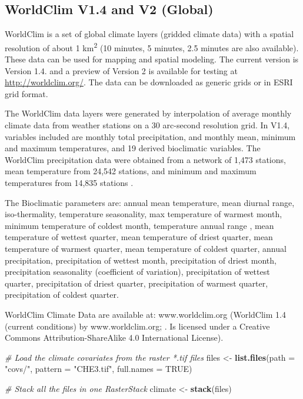 \documentclass[10pt,b5paper,]{book}
\newenvironment{Shaded}{\begin{snugshade}}{\end{snugshade}}
\newcommand{\CommentTok}[1]{\textcolor[rgb]{0.56,0.35,0.01}{\textit{#1}}}
\newcommand{\DataTypeTok}[1]{\textcolor[rgb]{0.13,0.29,0.53}{#1}}
\newcommand{\KeywordTok}[1]{\textcolor[rgb]{0.13,0.29,0.53}{\textbf{#1}}}
\newcommand{\NormalTok}[1]{#1}
\newcommand{\OtherTok}[1]{\textcolor[rgb]{0.56,0.35,0.01}{#1}}
\newcommand{\StringTok}[1]{\textcolor[rgb]{0.31,0.60,0.02}{#1}}
\theoremstyle{definition}
\theoremstyle{definition}
\theoremstyle{definition}
\theoremstyle{remark}
\begin{document}
\hypertarget{worldclim-v1.4-and-v2-global}{%
\subsection{WorldClim V1.4 and V2
(Global)}\label{worldclim-v1.4-and-v2-global}}

WorldClim is a set of global climate layers (gridded climate data) with
a spatial resolution of about 1 km\textsuperscript{2} (10 minutes, 5
minutes, 2.5 minutes are also available). These data can be used for
mapping and spatial modeling. The current version is Version 1.4. and a
preview of Version 2 is available for testing at
\url{http://worldclim.org/}. The data can be downloaded as generic grids
or in ESRI grid format.

The WorldClim data layers were generated by interpolation of average
monthly climate data from weather stations on a 30 arc-second resolution
grid. In V1.4, variables included are monthly total precipitation, and
monthly mean, minimum and maximum temperatures, and 19 derived
bioclimatic variables. The WorldClim precipitation data were obtained
from a network of 1,473 stations, mean temperature from 24,542 stations,
and minimum and maximum temperatures from 14,835 stations
\citep{hijmans2005very}.

The Bioclimatic parameters are: annual mean temperature, mean diurnal
range, iso-thermality, temperature seasonality, max temperature of
warmest month, minimum temperature of coldest month, temperature annual
range , mean temperature of wettest quarter, mean temperature of driest
quarter, mean temperature of warmest quarter, mean temperature of
coldest quarter, annual precipitation, precipitation of wettest month,
precipitation of driest month, precipitation seasonality (coefficient of
variation), precipitation of wettest quarter, precipitation of driest
quarter, precipitation of warmest quarter, precipitation of coldest
quarter.

WorldClim Climate Data are available at: www.worldclim.org (WorldClim
1.4 (current conditions) by www.worldclim.org; \citet{hijmans2005very}.
Is licensed under a Creative Commons Attribution-ShareAlike 4.0
International License).

\begin{Shaded}
\begin{Highlighting}[]
\CommentTok{# Load the climate covariates from the raster *.tif files}
\NormalTok{files <-}\StringTok{ }\KeywordTok{list.files}\NormalTok{(}\DataTypeTok{path =} \StringTok{"covs/"}\NormalTok{, }\DataTypeTok{pattern =} \StringTok{"CHE3.tif"}\NormalTok{, }
                    \DataTypeTok{full.names =} \OtherTok{TRUE}\NormalTok{)}

\CommentTok{# Stack all the files in one RasterStack}
\NormalTok{climate <-}\StringTok{ }\KeywordTok{stack}\NormalTok{(files)}
\end{Highlighting}
\end{Shaded}
\end{document}
